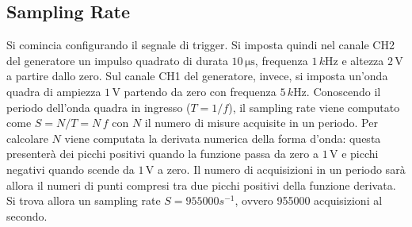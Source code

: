 \documentclass[a4paper,11pt]{article} %
\begin{document}
\subsection{Sampling Rate}
Si comincia configurando il segnale di trigger. Si imposta quindi nel canale CH2 del generatore un impulso quadrato di
durata $10\,\si{\us}$, frequenza $1\,\si{k\hertz}$ e altezza $2\,\si{\volt}$ a partire dallo zero. Sul canale CH1 del
generatore, invece, si imposta un'onda quadra di ampiezza $1\,\si{\volt}$ partendo da zero con frequenza
$5\,\si{k\hertz}$. Conoscendo il periodo dell'onda quadra in ingresso ($T=1/f$), il sampling rate viene computato come
$S = N / T = N \, f$ con $N$ il numero di misure acquisite in un periodo. Per calcolare $N$ viene computata la derivata
numerica della forma d'onda: questa presenterà dei picchi positivi quando la funzione passa da zero a $1\,\si{\volt}$ e
picchi negativi quando scende da $1\,\si{\volt}$ a zero. Il numero di acquisizioni in un periodo sarà allora il numeri
di punti compresi tra due picchi positivi della funzione derivata. Si trova allora un sampling rate $S = 955000 s^{-1}$,
ovvero 955000 acquisizioni al secondo.


\end{document}
